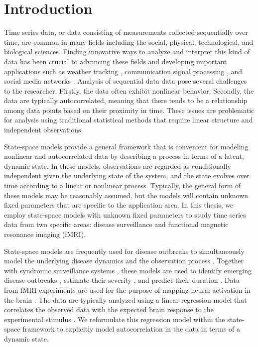 \chapter{Introduction}

Time series data, or data consisting of measurements collected sequentially over time, are common in many fields including the social, physical, technological, and biological sciences. Finding innovative ways to analyze and interpret this kind of data has been crucial to advancing these fields and developing important applications such as weather tracking \citep{dixon:wiener:weather:1993}, communication signal processing \citep{gardner:signal:1994}, and social media networks \citep{smith:social:2009}. Analysis of sequential data data pose several challenges to the researcher. Firstly, the data often exhibit nonlinear behavior. Secondly, the data are typically autocorrelated, meaning that there tends to be a relationship among data points based on their proximity in time. These issues are problematic for analysis using traditional statistical methods that require linear structure and independent observations.

State-space models provide a general framework that is convenient for modeling nonlinear and autocorrelated data by describing a process in terms of a latent, dynamic state. In these models, observations are regarded as conditionally independent given the underlying state of the system, and the state evolves over time according to a linear or nonlinear process. Typically, the general form of these models may be reasonably assumed, but the models will contain unknown fixed parameters that are specific to the application area. In this thesis, we employ state-space models with unknown fixed parameters to study time series data from two specific areas: disease surveillance and functional magnetic resonance imaging (fMRI).

State-space models are frequently used for disease outbreaks to simultaneously model the underlying disease dynamics and the observation process \citep{Mart:Cone:Lope:Lope:baye:2008, merl2009statistical, ludkovski2010optimal, skvortsov2012monitoring, unkel2012statistical}. Together with syndromic surveillance systems \citep{henning2004overview, wagner2006biosurveillance, wilson2006synsurveillance, hakenewerth2009north, Gins:Mohe:Pate:Bram:Smol:Bril:dete:2009}, these models are used to identify emerging disease outbreaks \citep{neill2006bayesian}, estimate their severity \citep{merl2009statistical}, and predict their duration \cite{ludkovski2010optimal}. Data from fMRI experiments are used for the purpose of mapping neural activation in the brain \citep{ashby:fmri:2011,kiebel:holmes:spm:2007,pold:fmri:2011}. The data are typically analyzed using a linear regression model that correlates the observed data with the expected brain response to the experimental stimulus \citep{friston:frith:JCBFM:1991,friston:holmes:hbm:1995}. We reformulate this regression model within the state-space framework to explicitly model autocorrelation in the data in terms of a dynamic state.


